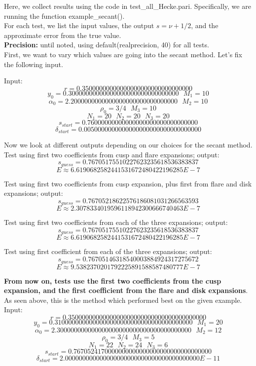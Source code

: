 \documentclass[]{article}
\begin{document}
Here, we collect results using the code in test\_all\_Hecke.pari.
Specifically, we are running the function example\_secant().
\\

For each test, we list the input values, the output $s = \nu + 1/2$, and the approximate error from the true value.
\\

\textbf{Precision:} until noted, using default(realprecision, 40) for all tests.
\\

First, we want to vary which values are going into the secant method.
Let's fix the following input.

Input:
$$
r = 0.35000000000000000000000000000000 $$$$
y_0 = 0.30000000000000000000000000000000 ~~~ M_1 = 10 $$$$
\alpha_0 = 2.2000000000000000000000000000000 ~~~ M_2 = 10 $$$$
\rho_0 = 3/4 ~~~ M_3 = 10 $$$$
N_1 = 20 ~~~ N_2 = 20 ~~~ N_3 = 20 $$$$
s_{start} = 0.76000000000000000000000000000000 $$$$
\delta_{start} = 0.0050000000000000000000000000000000
$$

Now we look at different outputs depending on our choices for the secant method.
\\

Test using first two coefficients from cusp and flare expansions; output:
$$
s_{guess} = 0.76705175510227623235618536383837 $$$$
E \approx 6.6190682582441531672480422196285 E-7
$$

Test using first two coefficients from cusp expansion, plus first from flare and disk expansions; output:
$$
s_{guess} = 0.76705218622576186081031266563593 $$$$
E \approx 2.3078334019596118942300666740463 E-7
$$

Test using first two coefficients from each of the three expansions; output:
$$
s_{guess} = 0.76705175510227623235618536383837 $$$$
E \approx 6.6190682582441531672480422196285 E-7
$$

Test using first coefficient from each of the three expansions; output:
$$
s_{guess} = 0.76705146318540003884924317275672 $$$$
E \approx 9.5382370201792225891588587480777 E-7
$$

\textbf{From now on, tests use the first two coefficients from the cusp expansion, and the first coefficient from the flare and disk expansions}.
As seen above, this is the method which performed best on the given example.
\\

Input:
$$
r = 0.3500000000000000000000000000000000000000 $$$$
y_0 = 0.3100000000000000000000000000000000000000 ~~~ M_1 = 20 $$$$
\alpha_0 = 2.300000000000000000000000000000000000000 ~~~ M_2 = 12 $$$$
\rho_0 = 3/4 ~~~ M_3 = 5 $$$$
N_1 = 22 ~~~ N_2 = 24 ~~~ N_3 = 6 $$$$
s_{start} = 0.7670524170000000000000000000000000000000 $$$$
\delta_{start} = 2.000000000000000000000000000000000000000 E-11
$$
\end{document}

